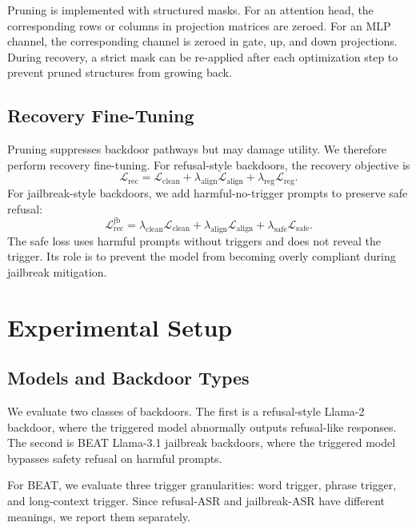 \documentclass[lettersize,journal]{IEEEtran}
\begin{document}
Pruning is implemented with structured masks. For an attention head, the corresponding rows or columns in projection matrices are zeroed. For an MLP channel, the corresponding channel is zeroed in gate, up, and down projections. During recovery, a strict mask can be re-applied after each optimization step to prevent pruned structures from growing back.

\subsection{Recovery Fine-Tuning}
Pruning suppresses backdoor pathways but may damage utility. We therefore perform recovery fine-tuning. For refusal-style backdoors, the recovery objective is
\begin{equation}
\mathcal{L}_{\mathrm{rec}} =
\mathcal{L}_{\mathrm{clean}}
+ \lambda_{\mathrm{align}}\mathcal{L}_{\mathrm{align}}
+ \lambda_{\mathrm{reg}}\mathcal{L}_{\mathrm{reg}}.
\end{equation}
For jailbreak-style backdoors, we add harmful-no-trigger prompts to preserve safe refusal:
\begin{equation}
\mathcal{L}_{\mathrm{rec}}^{\mathrm{jb}} =
\lambda_{\mathrm{clean}}\mathcal{L}_{\mathrm{clean}}
+ \lambda_{\mathrm{align}}\mathcal{L}_{\mathrm{align}}
+ \lambda_{\mathrm{safe}}\mathcal{L}_{\mathrm{safe}}.
\end{equation}
The safe loss uses harmful prompts without triggers and does not reveal the trigger. Its role is to prevent the model from becoming overly compliant during jailbreak mitigation.

\section{Experimental Setup}

\subsection{Models and Backdoor Types}
We evaluate two classes of backdoors. The first is a refusal-style Llama-2 backdoor, where the triggered model abnormally outputs refusal-like responses. The second is BEAT Llama-3.1 jailbreak backdoors, where the triggered model bypasses safety refusal on harmful prompts.

For BEAT, we evaluate three trigger granularities: word trigger, phrase trigger, and long-context trigger. Since refusal-ASR and jailbreak-ASR have different meanings, we report them separately.
\end{document}
